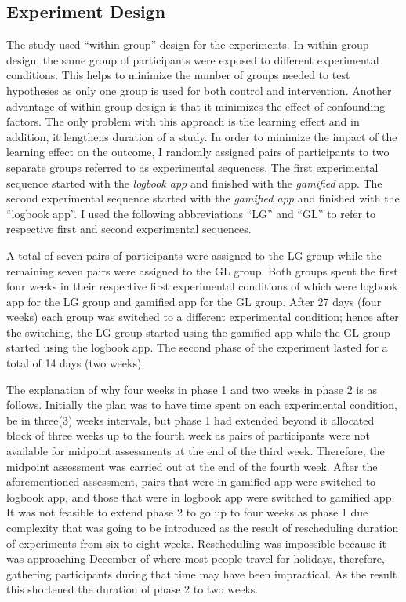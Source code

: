 \subsection{Experiment Design}
The study used ``within-group'' design for the experiments. In within-group design, the same group of participants were exposed to different experimental conditions. This helps to minimize the number of groups needed to test hypotheses as only one group is used for both control and intervention. Another advantage of within-group design is that it minimizes the effect of confounding factors. The only problem with this approach is the learning effect and in addition, it lengthens duration of a study. In order to minimize the impact of the learning effect on the outcome, I randomly assigned pairs of participants to two separate groups referred to as experimental sequences. The first experimental sequence started with the \emph{logbook app}  and finished with the \emph{gamified} app. The second experimental sequence started with the \emph{gamified app} and finished with the ``logbook app''. I used the following abbreviations ``LG'' and ``GL'' to refer to respective first and second experimental sequences.

A total of seven pairs of participants were assigned to the LG group while the remaining seven pairs were assigned to the GL group. Both groups spent the first four weeks in their respective first experimental conditions of which were logbook app for the LG group and gamified app for the GL group. After 27 days (four weeks) each group was switched to a different experimental condition; hence after the switching, the LG group started using the gamified app while the GL group started using the logbook app. The second phase of the experiment lasted for a total of 14 days (two weeks). 

The explanation of why four weeks in phase 1 and two weeks in phase 2 is as follows. Initially the plan was to have time spent on each experimental condition, be in three(3) weeks intervals, but phase 1 had extended beyond it allocated block of three weeks up to the fourth week as pairs of participants were not available for midpoint assessments at the end of the third week. Therefore, the midpoint assessment was carried out at the end of the fourth week. After the aforementioned assessment, pairs that were in gamified app were switched to logbook app, and those that were in logbook app were switched to gamified app. It was not feasible to extend phase 2 to go up to four weeks as phase 1 due complexity that was going to be introduced as the result of rescheduling duration of experiments from six to eight weeks. Rescheduling was impossible because it was approaching December of where most people travel for holidays, therefore, gathering participants during that time may have been impractical. As the result this shortened the duration of phase 2 to two weeks.
